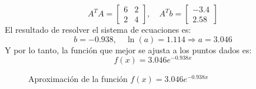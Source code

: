 \documentclass{article}
\begin{document}
\begin{equation}
    A^TA = \begin{bmatrix}
        6 & 2 \\
        2 & 4
    \end{bmatrix}, \quad A^Tb = \begin{bmatrix}
        -3.4 \\
        2.58
    \end{bmatrix}
\end{equation}
El resultado de resolver el sistema de ecuaciones es:
\begin{equation}
    b = -0.938, \quad \ln(a) = 1.114 \Rightarrow a = 3.046
\end{equation}
Y por lo tanto, la función que mejor se ajusta a los puntos dados es:
\begin{equation}
    f(x) = 3.046e^{-0.938x}
\end{equation}
\begin{figure}[h]
    \centering
    \caption{Aproximación de la función $f(x) = 3.046e^{-0.938x}$}
    \label{fig:myplot4}
\end{figure}
\end{document}
